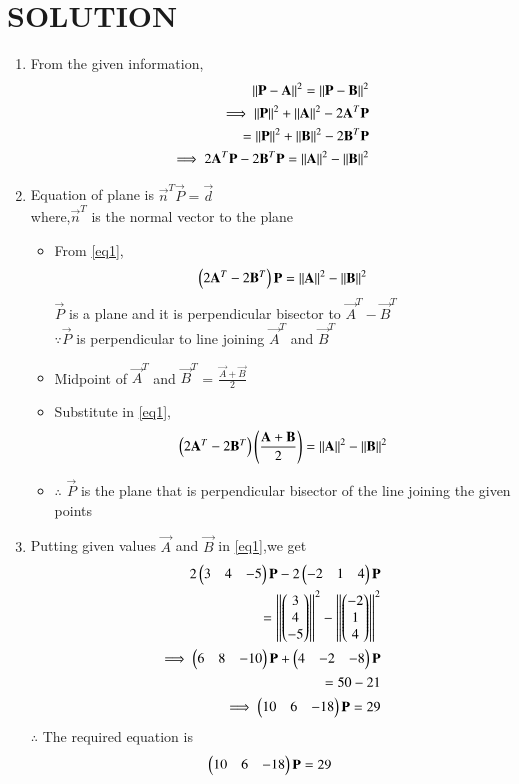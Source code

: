 \documentclass[journal,12pt,twocolumn]{IEEEtran}
\begin{document}
\section{SOLUTION} 
\begin{enumerate}
\item From the given information,
\begin{align}
\left\lVert\mathbf{P}-\mathbf{A}\right\rVert^2=\left\lVert\mathbf{P}-\mathbf{B}\right\rVert^2
\\
\implies\left\lVert\mathbf{P}\right\rVert^2+\left\lVert\mathbf{A}\right\rVert^2-2\mathbf{A}^T\mathbf{P}
\\
=\left\lVert\mathbf{P}\right\rVert^2+\left\lVert\mathbf{B}\right\rVert^2-2\mathbf{B}^T\mathbf{P}
\\
\implies 2\mathbf{A}^T\mathbf{P}-2\mathbf{B}^T\mathbf{P}=\left\lVert\mathbf{A}\right\rVert^2-\left\lVert\mathbf{B}\right\rVert^2  \label{eq1}
\end{align}
\item Equation of plane is $\vec{n}^T\vec{P}=\vec{d}$
\\
where,$\vec{n}^T$ is the normal vector to the plane 
\begin{itemize}
\item From \eqref{eq1},
\begin{align}
\begin{pmatrix}2\mathbf{A}^T-2\mathbf{B}^T\end{pmatrix}\mathbf{P}=\left\lVert\mathbf{A}\right\rVert^2-\left\lVert\mathbf{B}\right\rVert^2
\end{align}
$\vec{P}$ is a plane and it is perpendicular bisector to $\vec{A}^T-\vec{B}^T$
\\
$\because\vec{P}$ is perpendicular to line joining $\vec{A}^T$ and $\vec{B}^T$
\item Midpoint of $\vec{A}^T$ and $\vec{B}^T$ = $\frac{\vec{A}+\vec{B}}{2}$
\item Substitute in \eqref{eq1},
\begin{align}
\begin{pmatrix}2\mathbf{A}^T-2\mathbf{B}^T\end{pmatrix}\left(\frac{\mathbf{A}+\mathbf{B}}{2}\right)=\left\lVert\mathbf{A}\right\rVert^2-\left\lVert\mathbf{B}\right\rVert^2 
\end{align}
\item $\therefore$ $\vec{P}$ is the plane that is perpendicular bisector of the line joining the given points 
\end{itemize}
\item Putting given values $\vec{A}$ and $\vec{B}$ in \eqref{eq1},we get 
\begin{align}
2\begin{pmatrix}3 & 4 & -5\end{pmatrix}\mathbf{P}-2\begin{pmatrix}-2 & 1 & 4\end{pmatrix}\mathbf{P}
\\
=\left\lVert\begin{pmatrix}3\\4\\-5\end{pmatrix}\right\rVert^2-\left\lVert\begin{pmatrix}-2\\1\\4\end{pmatrix}\right\rVert^2
\\
\implies\begin{pmatrix}6 & 8 & -10\end{pmatrix}\mathbf{P}+\begin{pmatrix}4 & -2 & -8\end{pmatrix}\mathbf{P} 
\\
=50-21
\\
\implies\begin{pmatrix}10 & 6 & -18\end{pmatrix}\mathbf{P}=29
\end{align}
$\therefore$ The required equation is
\begin{align}
\begin{pmatrix}10 & 6 & -18\end{pmatrix}\mathbf{P}=29
\end{align}
\end{enumerate}
\end{document}
